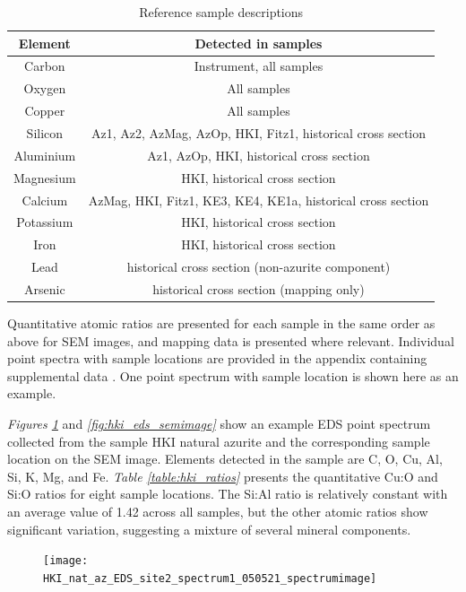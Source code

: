 \begin{table}[H]
\caption{Reference sample descriptions}
\centering
\label{table:eds_elems}
\begin{tabular}{c c}
\toprule
Element & Detected in samples \\
\midrule
Carbon & Instrument, all samples \\
Oxygen & All samples \\
Copper & All samples \\
Silicon & Az1, Az2, AzMag, AzOp, HKI, Fitz1, historical cross section \\
Aluminium & Az1, AzOp, HKI, historical cross section \\
Magnesium & HKI, historical cross section \\
Calcium & AzMag, HKI, Fitz1, KE3, KE4, KE1a, historical cross section \\
Potassium & HKI, historical cross section \\
Iron & HKI, historical cross section \\
Lead & historical cross section (non-azurite component) \\
Arsenic & historical cross section (mapping only) \\
\bottomrule
\end{tabular}
\end{table}

Quantitative atomic ratios are presented for each sample in the same order as above for SEM images, and mapping data is presented where relevant. Individual point spectra with sample locations are provided in the appendix containing supplemental data . One point spectrum with sample location is shown here as an example.


\textit{Figures \ref{fig:hki_eds_spec}} and \textit{\ref{fig:hki_eds_semimage}} show an example EDS point spectrum collected from the sample HKI natural azurite and the corresponding sample location on the SEM image. Elements detected in the sample are C, O, Cu, Al, Si, K, Mg, and Fe. \textit{Table \ref{table:hki_ratios}} presents the quantitative Cu:O and Si:O ratios for eight sample locations. The Si:Al ratio is relatively constant with an average value of 1.42 across all samples, but the other atomic ratios show significant variation, suggesting a mixture of several mineral components.

\begin{figure}[H]
\centering
  \texttt{[image: HKI\_nat\_az\_EDS\_site2\_spectrum1\_050521\_spectrumimage]}
\label{fig:hki_eds_spec}
\end{figure}

